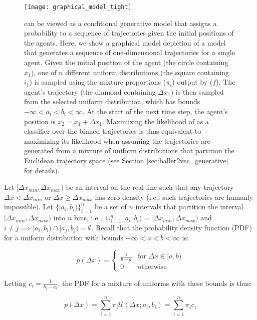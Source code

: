 \begin{wrapfigure}{r}{0.5\linewidth}
\vskip -0.2in
\texttt{[image: graphical\_model\_tight]}
\caption{
\btv{} can be viewed as a conditional generative model that assigns a probability to a sequence of trajectories given the initial positions of the agents.
Here, we show a graphical model depiction of a \btv{} model that generates a sequence of one-dimensional trajectories for a single agent.
Given the initial position of the agent (the circle containing $x_{1}$), one of $n$ different uniform distributions (the square containing $i_{1}$) is sampled using the mixture proportions ($\pi_{i}$) output by \btv{} ($f$).
The agent's trajectory (the diamond containing $\Delta x_{1}$) is then sampled from the selected uniform distribution, which has bounds $-\infty < a_{i} < b_{i} < \infty$.
At the start of the next time step, the agent's position is $x_{2} = x_{1} + \Delta x_{1}$.
Maximizing the likelihood of \btv{} as a classifier over the binned trajectories is thus equivalent to maximizing its likelihood when assuming the trajectories are generated from a mixture of uniform distributions that partition the Euclidean trajectory space (see Section \ref{sec:baller2vec_generative} for details).
}
\label{fig:graphical_model}
\end{wrapfigure}
Let $[\Delta x_{min}, \Delta x_{max})$ be an interval on the real line such that any trajectory $\Delta x < \Delta x_{min}$ or $\Delta x \geq \Delta x_{max}$ has zero density (i.e., such trajectories are humanly impossible).
Let $\{[a_{i}, b_{i})\}_{i=1}^{n}$ be a set of $n$ intervals that partition the interval $[\Delta x_{min}, \Delta x_{max})$ into $n$ bins, i.e., $\cup_{i=1}^{n} [a_{i}, b_{i}) = [\Delta x_{min}, \Delta x_{max})$ and $i \neq j \implies [a_{i}, b_{i}) \cap [a_{j}, b_{j}) = \emptyset$.
Recall that the probability density function (PDF) for a uniform distribution with bounds $-\infty < a < b < \infty$ is:

\[
    p(\Delta x) = 
    \begin{cases}
        \frac{1}{b - a} & \text{for } \Delta x \in [a,b)  \\
        0               & \text{otherwise}
    \end{cases}
\]

\noindent
Letting $c_{i} = \frac{1}{b_{i} - a_{i}}$, the PDF for a mixture of uniforms with these bounds is thus:

\begin{equation}\label{eq:mix_uniforms}
    p(\Delta x) = \sum_{i=1}^{n} \pi_{i} \mathcal{U}(\Delta x; a_{i}, b_{i}) = \sum_{i=1}^{n} \pi_{i} c_{i}
\end{equation}

